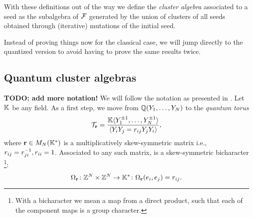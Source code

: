 \documentclass{article}
\begin{document}
\medskip

With these definitions out of the way we define the \emph{cluster algebra} associated to a seed
as the subalgebra of $\mathcal{F}$ generated by the union of clusters of all seeds
obtained through (iterative) mutations of the initial seed.

Instead of proving things now for the classical case,
we will jump directly to the quantized version to
avoid having to prove the same results twice.

\subsection{Quantum cluster algebras}

\textbf{TODO: add more notation!}
We will follow the notation as presented in \cite{GoodearlYakimov2017QCA}.
Let $\mathbb{K}$ be any field.
As a first step, we move from $\mathbb{Q}(Y_1, \dots, Y_N)$ to
the \emph{quantum torus}
\begin{equation*}
    \mathcal{T}_{\mathbf r} =
    \frac{\mathbb{K}\langle Y_1^{\pm 1}, \dots, Y_N^{\pm 1} \rangle}{\langle Y_iY_j = r_{ij}Y_jY_i \rangle},
\end{equation*}
where $\mathbf{r} \in M_N(\mathbb{K}^*)$ is a multiplicatively skew-symmetric matrix i.e.,
$r_{ij} = r_{ji}^{-1}, r_{ii} = 1$.
Associated to any such matrix, is a skew-symmetric bicharacter
\footnote{With a bicharacter we mean a map from a direct product,
    such that each of the component maps is a group character.}:
\begin{equation*}
    \Omega_{\mathbf{r}} \colon \mathbb{Z}^N \times \mathbb{Z}^N \to \mathbb{K}^* \colon
    \Omega_{\mathbf{r}}(e_i, e_j) = r_{ij}.
\end{equation*}
\end{document}
